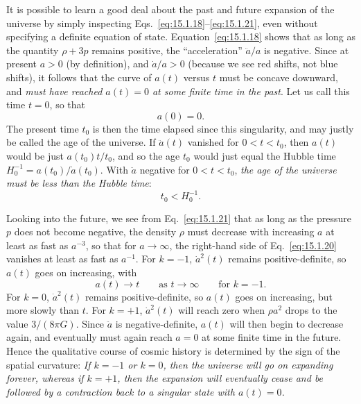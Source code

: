 It is possible to learn a good deal about the past and future expansion of the
universe by simply inspecting Eqs.~\eqref{eq:15.1.18}--\eqref{eq:15.1.21},
even without specifying a definite equation of state.
Equation~\eqref{eq:15.1.18} shows that as long as the quantity
\(\rho+3p\) remains positive, the ``acceleration'' \(\ddot a/a\) is
negative. Since at present \(a>0\) (by definition), and \(\dot a/a>0\)
(because we see red shifts, not blue shifts), it follows that the curve of
\(a(t)\) versus \(t\) must be concave downward, and \emph{must have
reached \(a(t)=0\) at some finite time in the past}. Let us call this time
\(t=0\), so that
\begin{equation}
  a(0)=0.
  \tag{15.1.24}\label{eq:15.1.24}
\end{equation}
The present time \(t_0\) is then the time elapsed since this singularity, and
may justly be called the age of the universe. If \(\ddot a(t)\) vanished for
\(0<t<t_0\), then \(a(t)\) would be just \(a(t_0)t/t_0\), and so the
age \(t_0\) would just equal the Hubble time
\(H_0^{-1}=a(t_0)/\dot a(t_0)\). With \(\ddot a\) negative for
\(0<t<t_0\), \emph{the age of the universe must be less than the Hubble
time}:
\begin{equation}
  t_0<H_0^{-1}.
  \tag{15.1.25}\label{eq:15.1.25}
\end{equation}

Looking into the future, we see from Eq.~\eqref{eq:15.1.21} that as long as
the pressure \(p\) does not become negative, the density \(\rho\) must
decrease with increasing \(a\) at least as fast as \(a^{-3}\), so that for
\(a\to\infty\), the right-hand side of Eq.~\eqref{eq:15.1.20} vanishes at
least as fast as \(a^{-1}\). For \(k=-1\), \(\dot a^2(t)\) remains
positive-definite, so \(a(t)\) goes on increasing, with
\[
  a(t)\longrightarrow t
  \qquad\text{as }t\longrightarrow\infty
  \qquad\text{for }k=-1.
\]
For \(k=0\), \(\dot a^2(t)\) remains positive-definite, so \(a(t)\) goes
on increasing, but more slowly than \(t\). For \(k=+1\), \(\dot a^2(t)\)
will reach zero when \(\rho a^2\) drops to the value \(3/(8\pi G)\).
Since \(\ddot a\) is negative-definite, \(a(t)\) will then begin to
decrease again, and eventually must again reach \(a=0\) at some finite time
in the future. Hence the qualitative course of cosmic history is determined
by the sign of the spatial curvature: \emph{If \(k=-1\) or \(k=0\), then
the universe will go on expanding forever, whereas if \(k=+1\), then the
expansion will eventually cease and be followed by a contraction back to a
singular state with \(a(t)=0\).}

